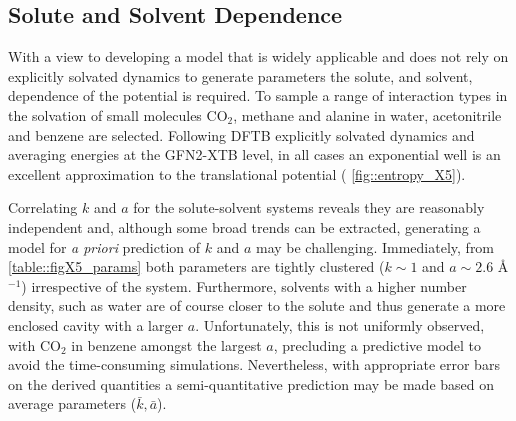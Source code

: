 \documentclass[../main.tex]{subfiles}
\begin{document}
\subsection{Solute and Solvent Dependence}

With a view to developing a model that is widely applicable and does not rely on explicitly solvated dynamics to generate parameters the solute, and solvent, dependence of the potential is required. To sample a range of interaction types in the solvation of small molecules CO$_2$, methane and alanine in water, acetonitrile and benzene are selected. Following DFTB explicitly solvated dynamics and averaging energies at the GFN2-XTB level, in all cases an exponential well is an excellent approximation to the translational potential (\figurename{ \ref{fig::entropy_X5}}). 

Correlating $k$ and $a$ for the solute-solvent systems reveals they are reasonably independent and, although some broad trends can be extracted, generating a model for \emph{a priori} prediction of $k$ and $a$ may be challenging. Immediately, from \tablename{ \ref{table::figX5_params}} both parameters are tightly clustered ($k \sim 1$ \kcal and $a \sim 2.6 $ \AA$^{-1}$) irrespective of the system. Furthermore, solvents with a higher number density, such as water are of course closer to the solute and thus generate a more enclosed cavity with a larger $a$. Unfortunately, this is not uniformly observed, with CO$_2$ in benzene amongst the largest $a$, precluding a predictive model to avoid the time-consuming simulations. Nevertheless, with appropriate error bars on the derived quantities a semi-quantitative prediction may be made based on average parameters ($\bar{k}, \bar{a}$). 
\end{document}
